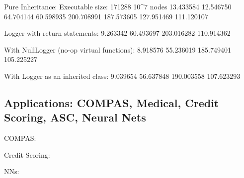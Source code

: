 \documentclass[]{article}
\begin{document}
Pure Inheritance:
Executable size: 171288
10^7 nodes
13.433584 12.546750
64.704144 60.598935
200.708991 187.573605
127.951469 111.120107

Logger with return statements:
9.263342
60.493697
203.016282
110.914362

With NullLogger (no-op virtual functions):
8.918576
55.236019
185.749401
105.225227

With Logger as an inherited class:
9.039654
56.637848
190.003558
107.623293

\subsection{Applications: COMPAS, Medical, Credit Scoring, ASC, Neural Nets}

COMPAS:

Credit Scoring:

NNs:

\printbibliography
\end{document}
